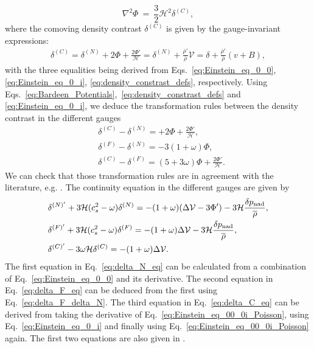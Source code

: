 \documentclass[twocolumn,superscriptaddress,aps,preprintnumbers,amsmath,amssymb,prl,footinbib]{revtex4-2}
\begin{document}
\begin{equation}
\label{eq:Einstein_eq_00_0i_Poisson}
    \nabla^2\Phi ~=~ \frac{3}{2}\mathcal{H}^2\delta^{(C)},
\end{equation}
where the comoving density contrast $\delta^{(C)}$ is given by the gauge-invariant expressions:
\begin{align}
\label{eq:Delta_def}
    \delta^{(C)}= \delta^{(N)} +2\Phi+\frac{2\Phi'}{\mathcal{H}} =\delta^{(N)}  + \frac{\overline{\rho}'}{\overline{\rho}}\mathcal{V}=\delta  + \frac{\overline{\rho}'}{\overline{\rho}}(v+B) ,
\end{align}
with the three equalities being derived from Eqs.~\eqref{eq:Einstein_eq_0_0}, \eqref{eq:Einstein_eq_0_i}, \eqref{eq:density_constrast_defs}, respectively.
Using Eqs.~\eqref{eq:Bardeen_Potentials},~\eqref{eq:density_constrast_defs} and \eqref{eq:Einstein_eq_0_i}, we deduce the transformation rules between the density contrast in the different gauges
\begin{align}
    &\delta^{(C)}-\delta^{(N)}=+2\Phi+\frac{2\Phi'}{\mathcal{H}}, \label{eq:delta_C_delta_N}\\
    &\delta^{(F)}-\delta^{(N)}=-3(1+\omega)\Phi, \label{eq:delta_F_delta_N}\\
    &\delta^{(C)}-\delta^{(F)}= (5+3\omega)\Phi +\frac{2\Phi'}{\mathcal{H}}.\label{eq:delta_C_delta_F}
\end{align}
We can check that those transformation rules are in agreement with the literature, e.g. \cite[Eqs.~5.87]{Peter:2013avv}.
The continuity equation in the different gauges are given by
\begin{align}
&\delta^{(N)'}+3\mathcal{H}(c_s^2-\omega)\delta^{(N)}=-(1+\omega)(\Delta \mathcal{V}-3\Phi')-3\mathcal{H}\frac{\delta p_{\rm nad}}{\overline{\rho}},\label{eq:delta_N_eq}\\
&\delta^{(F)'}+3\mathcal{H}(c_s^2-\omega)\delta^{(F)}=-(1+\omega)\Delta \mathcal{V}-3\mathcal{H}\frac{\delta p_{\rm nad}}{\overline{\rho}},\label{eq:delta_F_eq}\\
&\delta^{(C)'}-3\omega\mathcal{H}\delta^{(C)}=-(1+\omega)\Delta \mathcal{V}.\label{eq:delta_C_eq}
\end{align}
The first equation in Eq.~\eqref{eq:delta_N_eq} can be calculated from a combination of Eq.~\eqref{eq:Einstein_eq_0_0} and its derivative. The second equation in Eq.~\eqref{eq:delta_F_eq} can be deduced from the first using Eq.~\eqref{eq:delta_F_delta_N}. The third equation in Eq.~\eqref{eq:delta_C_eq} can be derived from taking the derivative of Eq.~\eqref{eq:Einstein_eq_00_0i_Poisson}, using Eq.~\eqref{eq:Einstein_eq_0_i} and finally using Eq.~\eqref{eq:Einstein_eq_00_0i_Poisson} again. The first two equations are also given in \cite[Eqs.~5.125 and 5.128]{Peter:2013avv}.
\end{document}
